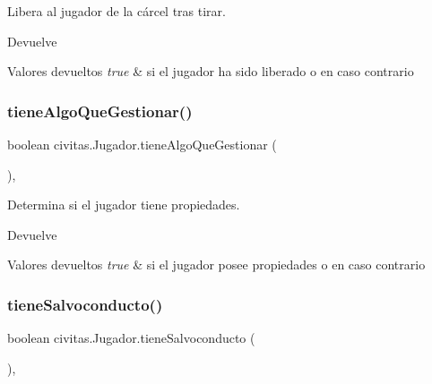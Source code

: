 Libera al jugador de la cárcel tras tirar. \begin{DoxyReturn}{Devuelve}

\end{DoxyReturn}

\begin{DoxyRetVals}{Valores devueltos}
{\em true} & si el jugador ha sido liberado o  en caso contrario \\
\hline
\end{DoxyRetVals}
\mbox{\label{classcivitas_1_1Jugador_a076d9059f63b0176becea3c15dc98493}} 
\subsubsection{\texorpdfstring{tiene\+Algo\+Que\+Gestionar()}{tieneAlgoQueGestionar()}}
{\footnotesize\ttfamily boolean civitas.\+Jugador.\+tiene\+Algo\+Que\+Gestionar (\begin{DoxyParamCaption}{ }\end{DoxyParamCaption})\hspace{0.3cm}{\ttfamily [inline]}, {\ttfamily [package]}}

Determina si el jugador tiene propiedades. \begin{DoxyReturn}{Devuelve}

\end{DoxyReturn}

\begin{DoxyRetVals}{Valores devueltos}
{\em true} & si el jugador posee propiedades o  en caso contrario \\
\hline
\end{DoxyRetVals}
\mbox{\label{classcivitas_1_1Jugador_a378e9a4405d9c44defeddd7488f5a9f9}} 
\subsubsection{\texorpdfstring{tiene\+Salvoconducto()}{tieneSalvoconducto()}}
{\footnotesize\ttfamily boolean civitas.\+Jugador.\+tiene\+Salvoconducto (\begin{DoxyParamCaption}{ }\end{DoxyParamCaption})\hspace{0.3cm}{\ttfamily [inline]}, {\ttfamily [package]}}

